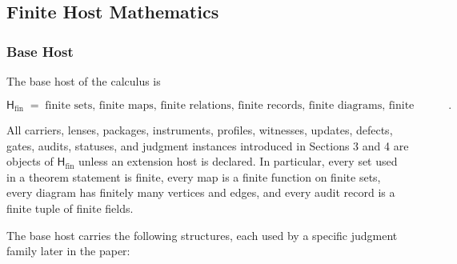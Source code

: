 \documentclass[11pt]{article}
\theoremstyle{definition}
\begin{document}
\subsection{Finite Host Mathematics}

\subsubsection{Base Host}

The base host of the calculus is

\[
\mathsf H_{\mathrm{fin}} \;=\; \text{finite sets, finite maps, finite relations, finite records, finite diagrams, finite graphs, finite audit records}.
\]

All carriers, lenses, packages, instruments, profiles, witnesses, updates, defects, gates, audits, statuses, and judgment instances introduced in Sections 3 and 4 are objects of \(\mathsf H_{\mathrm{fin}}\) unless an extension host is declared. In particular, every set used in a theorem statement is finite, every map is a finite function on finite sets, every diagram has finitely many vertices and edges, and every audit record is a finite tuple of finite fields.

The base host carries the following structures, each used by a specific judgment family later in the paper:
\end{document}
